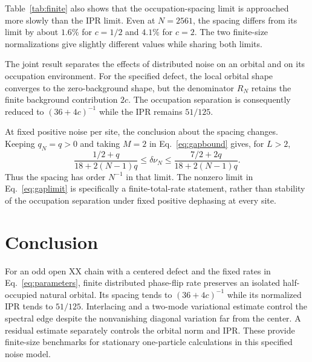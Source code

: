 \documentclass[11pt,a4paper]{article}
\begin{document}
\begin{table}[t]
 \centering
 \caption{Finite values at $N=2561$ for both background conventions.
 All quantities displayed are dimensionless, and numerical entries
 are rounded to nine decimal places. The limiting IPR is $0.408$ in
 every row. The difference between a finite value and its limit is
 a size effect, not an estimated numerical uncertainty.}
 \label{tab:finite}
 
\end{table}

Table~\ref{tab:finite} also shows that the occupation-spacing limit
is approached more slowly than the IPR limit. Even at $N=2561$,
the spacing differs from its limit by about $1.6\%$ for $c=1/2$
and $4.1\%$ for $c=2$. The two finite-size normalizations give
slightly different values while sharing both limits.

The joint result separates the effects of distributed noise on an
orbital and on its occupation environment. For the specified defect,
the local orbital shape converges to the zero-background shape,
but the denominator $R_N$ retains the finite background contribution
$2c$. The occupation separation is consequently reduced to
$(36+4c)^{-1}$ while the IPR remains $51/125$.

At fixed positive noise per site, the conclusion about the spacing
changes. Keeping $q_N=q>0$ and taking $M=2$ in
Eq.~\eqref{eq:gapbound} gives, for $L>2$,
\begin{equation}
 \frac{1/2+q}{18+2(N-1)q}
 \le\delta\nu_N\le
 \frac{7/2+2q}{18+2(N-1)q}.
 \label{eq:fixedq}
\end{equation}
Thus the spacing has order $N^{-1}$ in that limit. The nonzero
limit in Eq.~\eqref{eq:gaplimit} is specifically a finite-total-rate
statement, rather than stability of the occupation separation under
fixed positive dephasing at every site.

\section{Conclusion}
For an odd open XX chain with a centered defect and the fixed rates
in Eq.~\eqref{eq:parameters}, finite distributed phase-flip rate
preserves an isolated half-occupied natural orbital. Its spacing tends
to $(36+4c)^{-1}$ while its normalized IPR tends to $51/125$.
Interlacing and a two-mode variational estimate control the spectral
edge despite the nonvanishing diagonal variation far from the
center. A residual estimate separately controls the orbital norm
and IPR. These provide finite-size benchmarks for stationary
one-particle calculations in this specified noise model.
\end{document}

